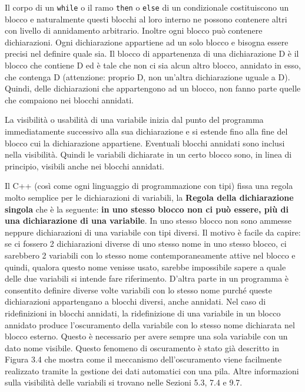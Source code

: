 Il corpo di un \texttt{while} o il ramo \texttt{then} o \texttt{else} di un condizionale costituiscono un blocco e naturalmente questi blocchi al loro interno ne possono contenere altri con livello di annidamento arbitrario.
Inoltre ogni blocco può contenere dichiarazioni.
Ogni dichiarazione appartiene ad un solo blocco e bisogna essere precisi nel definire quale sia.
Il blocco di appartenenza di una dichiarazione D è il blocco che contiene D ed è tale che non ci sia alcun altro blocco, annidato in esso, che contenga D (attenzione: proprio D, non un'altra dichiarazione uguale a D).
Quindi, delle dichiarazioni che appartengono ad un blocco, non fanno parte quelle che compaiono nei blocchi annidati. 

La visibilità o usabilità di una variabile inizia dal punto del programma immediatamente successivo alla sua dichiarazione e si estende fino alla fine del blocco cui la dichiarazione appartiene. Eventuali blocchi annidati sono inclusi nella visibilità. Quindi le variabili dichiarate in un certo blocco sono, in linea di principio, visibili anche nei blocchi annidati. 

Il C++ (così come ogni linguaggio di programmazione con tipi) fissa una regola molto semplice per le dichiarazioni di variabili, la \textbf{Regola della dichiarazione singola} che è la seguente: \textbf{in uno stesso blocco non ci può essere, più di una dichiarazione di una variabile}.
In uno stesso blocco non sono ammesse neppure dichiarazioni di una variabile con tipi diversi.
Il motivo è facile da capire: se ci fossero 2 dichiarazioni diverse di uno stesso nome in uno stesso blocco, ci sarebbero 2 variabili con lo stesso nome contemporaneamente attive nel blocco e quindi, qualora questo nome venisse usato, sarebbe impossibile sapere a quale delle due variabili si intende fare riferimento.
D'altra parte in un programma è consentito definire diverse volte variabili con lo stesso nome purché queste dichiarazioni appartengano a blocchi diversi, anche annidati.
Nel caso di ridefinizioni in blocchi annidati, la ridefinizione di una variabile in un blocco annidato produce l'oscuramento della variabile con lo stesso nome dichiarata nel blocco esterno.
Questo è necessario per avere sempre una sola variabile con un dato nome visibile.
Questo fenomeno di oscuramento è stato già descritto in Figura 3.4 che mostra come il meccanismo dell'oscuramento viene facilmente realizzato tramite la gestione dei dati automatici con una pila.
Altre informazioni sulla visibilità delle variabili si trovano nelle Sezioni 5.3, 7.4 e 9.7.

